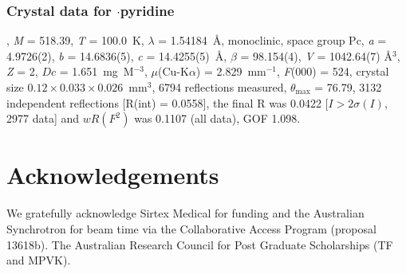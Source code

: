 \begin{refsection}
\subsubsection{Crystal data for \texorpdfstring{$\cdot$pyridine}{C19H12N4O4Se.C5H5N}}
, \emph{M} = 518.39, \emph{T} = 100.0~K, $\lambda$ = 1.54184~\AA, monoclinic, space group Pc, \emph{a} = 4.9726(2), \emph{b} = 14.6836(5), \emph{c} = 14.4255(5)~\AA, $\beta$ = 98.154(4)\degree, \emph{V} = 1042.64(7) \AA$^3$, \emph{Z} = 2, $Dc$ = 1.651~mg~M$^{-3}$, $\mu$(Cu-K$\alpha$) = 2.829~mm$^{-1}$, \emph{F}(000) = 524, crystal size $0.12 \times 0.033 \times 0.026$~mm$^3$, 6794 reflections measured, $\theta_{\max}$ = 76.79\degree, 3132 independent reflections [R(int) = 0.0558], the final R was 0.0422 [$I > 2\sigma(I)$, 2977 data] and $wR(F^2)$ was 0.1107 (all data), GOF 1.098.

\section{Acknowledgements}
We gratefully acknowledge Sirtex Medical for funding and the Australian Synchrotron for beam time via the Collaborative Access Program (proposal 13618b).
The Australian Research Council for Post Graduate Scholarships (TF and MPVK).

\printbibliography[heading=subbibliography]
\end{refsection}
